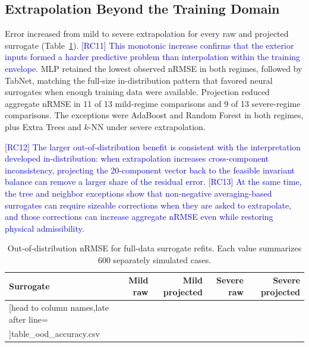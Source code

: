 \documentclass[a4paper,fleqn]{cas-sc}
\newcommand{\rccite}[2]{\textcolor{blue}{[#1] #2}}
\newcommand{\csvrowsfive}[1]{%
  \csvreader[head to column names,late after line=\\]{#1}{}{\colA & \colB & \colC & \colD & \colE}}
\begin{document}
\subsection{Extrapolation Beyond the Training Domain}

Error increased from mild to severe extrapolation for every raw and projected surrogate (Table~\ref{tab:ood_accuracy}). \rccite{RC11}{This monotonic increase confirms that the exterior inputs formed a harder predictive problem than interpolation within the training envelope.} MLP retained the lowest observed nRMSE in both regimes, followed by TabNet, matching the full-size in-distribution pattern that favored neural surrogates when enough training data were available. Projection reduced aggregate nRMSE in 11 of 13 mild-regime comparisons and 9 of 13 severe-regime comparisons. The exceptions were AdaBoost and Random Forest in both regimes, plus Extra Trees and $k$-NN under severe extrapolation.

\rccite{RC12}{The larger out-of-distribution benefit is consistent with the interpretation developed in-distribution: when extrapolation increases cross-component inconsistency, projecting the 20-component vector back to the feasible invariant balance can remove a larger share of the residual error.} \rccite{RC13}{At the same time, the tree and neighbor exceptions show that non-negative averaging-based surrogates can require sizeable corrections when they are asked to extrapolate, and those corrections can increase aggregate nRMSE even while restoring physical admissibility.}

\FloatBarrier
\begin{table}[H]
\centering
\caption{Out-of-distribution nRMSE for full-data surrogate refits. Each value summarizes 600 separately simulated cases.}
\label{tab:ood_accuracy}
\scriptsize
\begin{tabular}{lrrrr}
\toprule
Surrogate & Mild raw & Mild projected & Severe raw & Severe projected \\
\midrule
\csvrowsfive{table_ood_accuracy.csv}
\bottomrule
\end{tabular}
\end{table}
\FloatBarrier
\end{document}

